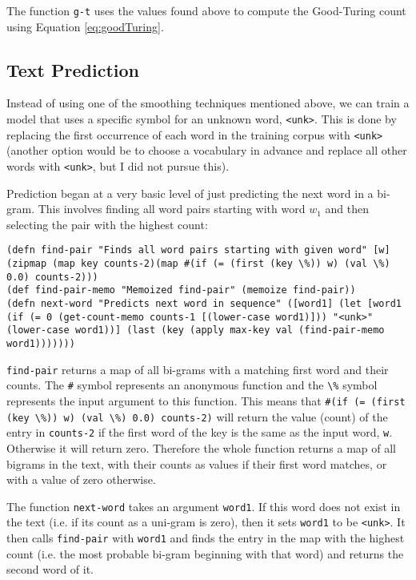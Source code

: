 The function \lstinline!g-t! uses the values found above to compute the Good-Turing count using Equation \ref{eq:goodTuring}.

\subsection{Text Prediction}

Instead of using one of the smoothing techniques mentioned above, we can train a model that uses a specific symbol for an unknown word, \lstinline!<unk>!. This is done by replacing the first occurrence of each word in the training corpus with \lstinline!<unk>! (another option would be to choose a vocabulary in advance and replace all other words with \lstinline!<unk>!, but I did not pursue this).

Prediction began at a very basic level of just predicting the next word in a bi-gram. This involves finding all word pairs starting with word $w_{1}$ and then selecting the pair with the highest count:

\begin{lstlisting}
(defn find-pair "Finds all word pairs starting with given word" [w] (zipmap (map key counts-2)(map #(if (= (first (key \%)) w) (val \%) 0.0) counts-2)))
(def find-pair-memo "Memoized find-pair" (memoize find-pair))
(defn next-word "Predicts next word in sequence" ([word1] (let [word1 (if (= 0 (get-count-memo counts-1 [(lower-case word1)])) "<unk>" (lower-case word1))] (last (key (apply max-key val (find-pair-memo word1)))))))
\end{lstlisting}

\lstinline!find-pair! returns a map of all bi-grams with a matching first word and their counts. The \lstinline!#! symbol represents an anonymous function and the \lstinline!\%! symbol represents the input argument to this function. This means that \lstinline!#(if (= (first (key \%)) w) (val \%) 0.0) counts-2)! will return the value (count) of the entry in \lstinline!counts-2! if the first word of the key is the same as the input word, \lstinline!w!. Otherwise it will return zero. Therefore the whole function returns a map of all bigrams in the text, with their counts as values if their first word matches, or with a value of zero otherwise.

The function \lstinline!next-word! takes an argument \lstinline!word1!. If this word does not exist in the text (i.e. if its count as a uni-gram is zero), then it sets \lstinline!word1! to be \lstinline!<unk>!. It then calls \lstinline!find-pair! with \lstinline!word1! and finds the entry in the map with the highest count (i.e. the most probable bi-gram beginning with that word) and returns the second word of it.


